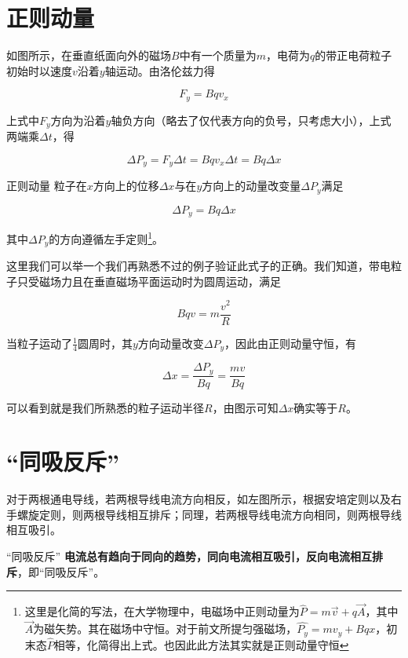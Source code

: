 \section{正则动量}


如图所示，在垂直纸面向外的磁场$B$中有一个质量为$m$，电荷为$q$的带正电荷粒子初始时以速度$v$沿着$y$轴运动。由洛伦兹力得

$$F_y = B q v_x$$

上式中$F_y$方向为沿着$y$轴负方向（略去了仅代表方向的负号，只考虑大小），上式两端乘$\Delta t$，得

$$\Delta P_y = F_y \Delta t = B q v_x \Delta t = B q \Delta x$$

\begin{theo}{正则动量}{}
粒子在$x$方向上的位移$\Delta x$与在$y$方向上的动量改变量$\Delta P_y$满足

$$\Delta P_y = B q \Delta x$$

其中$\Delta P_y$的方向遵循左手定则\footnote{这里是化简的写法，在大学物理中，电磁场中正则动量为$\hat{P} = m \vec{v} + q \vec{A}$，其中$\vec{A}$为磁矢势。其在磁场中守恒。对于前文所提匀强磁场，$\hat{P_y} = m v_y + B q x$，初末态$\hat{P}$相等，化简得出上式。也因此此方法其实就是正则动量守恒}。

\end{theo}

这里我们可以举一个我们再熟悉不过的例子验证此式子的正确。我们知道，带电粒子只受磁场力且在垂直磁场平面运动时为圆周运动，满足

$$B q v = m \frac{v^2}{R}$$

当粒子运动了$\frac{1}{4}$圆周时，其$y$方向动量改变$\Delta P_y$，因此由正则动量守恒，有

$$\Delta x = \frac{\Delta P_y}{B q} = \frac{m v}{B q}$$

可以看到就是我们所熟悉的粒子运动半径$R$，由图示可知$\Delta x$确实等于$R$。

\section{“同吸反斥”}



对于两根通电导线，若两根导线电流方向相反，如左图所示，根据安培定则以及右手螺旋定则，则两根导线相互排斥；同理，若两根导线电流方向相同，则两根导线相互吸引。

\begin{theo}{“同吸反斥”}{}
\textbf{电流总有趋向于同向的趋势，同向电流相互吸引，反向电流相互排斥}，即“同吸反斥”。
\end{theo}

